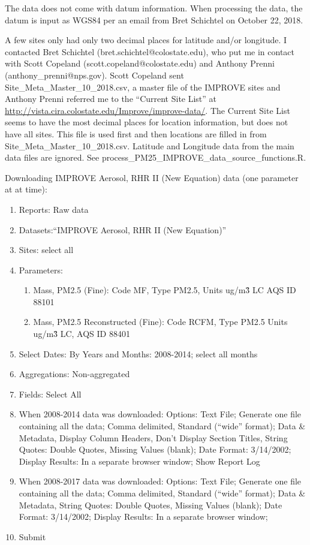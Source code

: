 The data does not come with datum information. When processing the data, the datum is input as WGS84 per an email from Bret Schichtel on October 22, 2018.

A few sites only had only two decimal places for latitude and/or longitude. I contacted Bret Schichtel (bret.schichtel@colostate.edu), who put me in contact with Scott Copeland (scott.copeland@colostate.edu) and Anthony Prenni (anthony\_prenni@nps.gov). Scott Copeland sent Site\_Meta\_Master\_10\_2018.csv, a master file of the IMPROVE sites and Anthony Prenni referred me to the ``Current Site List'' at \url{http://vista.cira.colostate.edu/Improve/improve-data/}. The Current Site List seems to have the most decimal places for location information, but does not have all sites. This file is used first and then locations are filled in from Site\_Meta\_Master\_10\_2018.csv. Latitude and Longitude data from the main data files are ignored. See process\_PM25\_IMPROVE\_data\_source\_functions.R.
\bigskip

\noindent Downloading IMPROVE Aerosol, RHR II (New Equation) data (one parameter at at time):
\begin{enumerate}
\item Reports: Raw data
\item Datasets:``IMPROVE Aerosol, RHR II (New Equation)''
\item Sites: select all
\item Parameters: 
  \begin{enumerate}
  \item Mass, PM2.5 (Fine): Code MF, Type PM2.5, Units ug/m\^3 LC AQS ID 88101
  \item Mass, PM2.5 Reconstructed (Fine): Code RCFM, Type PM2.5 Units ug/m\^3 LC, AQS ID 88401
  \end{enumerate}
\item Select Dates: By Years and Months: 2008-2014; select all months
\item Aggregations: Non-aggregated
\item Fields: Select All
\item When 2008-2014 data was downloaded: Options: Text File; Generate one file containing all the data; Comma delimited, Standard (``wide'' format); Data \& Metadata, Display Column Headers, Don't Display Section Titles, String Quotes: Double Quotes, Missing Values (blank); Date Format: 3/14/2002; Display Results: In a separate browser window; Show Report Log
\item When 2008-2017 data was downloaded: Options: Text File; Generate one file containing all the data; Comma delimited, Standard (``wide'' format); Data \& Metadata, %
String Quotes: Double Quotes, Missing Values (blank); Date Format: 3/14/2002; Display Results: In a separate browser window; %

\item Submit
\end{enumerate}

